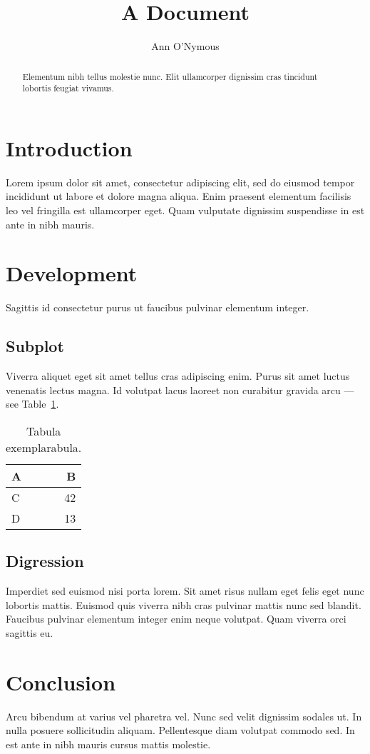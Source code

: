 \documentclass{article}
\title{A Document}
\author{Ann O'Nymous}
\begin{document}
\maketitle

\begin{abstract}
Elementum nibh tellus molestie nunc. Elit ullamcorper dignissim cras tincidunt lobortis feugiat vivamus.
\end{abstract}

\section{Introduction}

Lorem \quod ipsum dolor sit amet, consectetur adipiscing elit, sed do eiusmod tempor incididunt ut labore et dolore magna aliqua. Enim praesent elementum facilisis leo vel fringilla est ullamcorper eget. Quam vulputate dignissim suspendisse in est ante in nibh mauris. 

\section{Development}

Sagittis id consectetur purus ut faucibus pulvinar elementum integer.

\subsection{Subplot}

Viverra aliquet eget sit amet tellus cras adipiscing enim. Purus sit amet luctus venenatis lectus magna. Id volutpat lacus laoreet non curabitur gravida arcu --- see Table~\ref{tab:widgets}.

\begin{table}[h]
\centering
\begin{tabular}{l|r}
A & B \\\hline
C & 42 \\
D & 13
\end{tabular}
\caption{\label{tab:widgets}Tabula exemplarabula.}
\end{table}

\subsection{Digression}

Imperdiet sed euismod nisi porta lorem. Sit amet risus nullam eget felis eget nunc lobortis mattis. Euismod quis viverra nibh cras pulvinar mattis nunc sed blandit. Faucibus pulvinar elementum integer enim neque volutpat. Quam viverra orci sagittis eu.

\section{Conclusion}

Arcu bibendum at varius vel pharetra vel. Nunc sed velit dignissim sodales ut. In nulla posuere sollicitudin aliquam. Pellentesque diam volutpat commodo sed. In est ante in nibh mauris cursus mattis molestie. 

% 
% 
\end{document}
